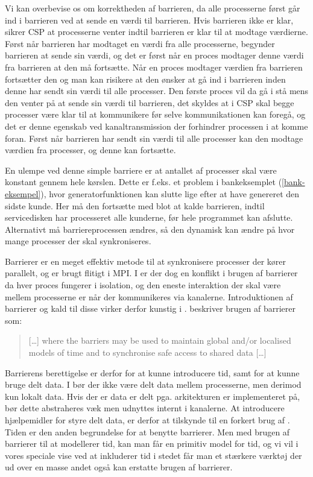 Vi kan overbevise os om korrektheden af barrieren, da alle processerne først 
går ind i barrieren ved at sende en værdi til barrieren. Hvis barrieren ikke er 
klar, sikrer CSP at processerne venter indtil barrieren er klar til at modtage 
værdierne. Først når barrieren har modtaget en værdi fra alle processerne, 
begynder barrieren at sende sin værdi, og det er først når en proces modtager 
denne værdi fra barrieren at den må fortsætte. Når en proces modtager værdien 
fra barrieren fortsætter den og man kan risikere at den ønsker at gå ind i 
barrieren inden denne har sendt sin værdi til alle processer. Den første proces 
vil da gå i stå mens den venter på at sende sin værdi til barrieren, det skyldes at i CSP skal begge processer  være klar til at kommunikere før selve kommunikationen kan foregå, og det er denne egenskab ved kanaltransmission der  forhindrer processen i at komme foran. Først når barrieren har sendt sin værdi til alle 
processer kan den modtage værdien fra processer, og denne kan fortsætte. 

En ulempe ved denne simple barriere er at antallet af processer skal være 
konstant gennem hele kørslen.
Dette er f.eks. et problem i bankeksemplet (\cref{bank-eksempel}), hvor 
generatorfunktionen kan slutte lige efter at have genereret den sidste kunde.  
Her må den fortsætte med blot at kalde barrieren, indtil servicedisken har 
processeret alle kunderne, før hele programmet kan afslutte. Alternativt må 
barriereprocessen ændres, så den dynamisk kan ændre på hvor mange processer der 
skal synkroniseres. 

Barrierer er en meget effektiv metode til at synkronisere processer der kører parallelt, og er brugt flitigt i MPI. I \csp er der dog en konflikt i brugen af barrierer da hver proces fungerer i isolation, og den eneste interaktion der skal være mellem processerne er når der kommunikeres via kanalerne. Introduktionen af barrierer og kald til disse virker derfor kunstig i \csp.  beskriver brugen af barrierer som:
\begin{otherlanguage}{english}
\begin{quote}
[\ldots] where the barriers may be used to maintain global and/or localised models of time and to synchronise safe access to shared data [\ldots]
\end{quote}
\end{otherlanguage}
Barrierens berettigelse er derfor for at kunne introducere tid, samt for at kunne bruge delt data. I \csp bør der ikke være delt data mellem processerne, men derimod kun  lokalt data. Hvis der er data er delt pga. arkitekturen \csp er implementeret på, bør dette abstraheres væk men udnyttes internt i kanalerne. At introducere hjælpemidler for styre delt data, er derfor at tilskynde til en forkert brug af \csp. Tiden er den anden begrundelse for at benytte barrierer. Men med brugen af barrierer til at modellerer tid, kan man får  en primitiv model for tid, og vi vil i vores speciale vise ved at inkluderer tid i stedet får man et stærkere værktøj der ud over en masse andet også kan erstatte brugen af barrierer.

